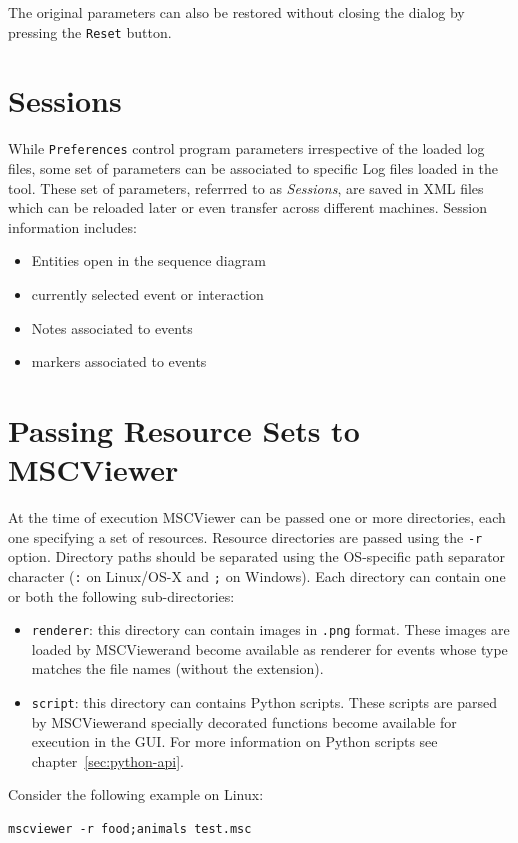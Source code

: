 \documentclass[11pt, twoside, titlepage]{book}
\newcommand{\prog}{MSCViewer}
\begin{document}
The original parameters can also be restored without closing the dialog by pressing the \texttt{Reset}
button.
 
\section{Sessions}
While \texttt{Preferences} control program parameters irrespective of the loaded log files, some set 
of parameters can be associated to specific Log files loaded in the tool. These set of parameters, 
referrred to as \textit{Sessions}, are saved in XML files which can be reloaded later or even
transfer across different machines. Session information includes:
\begin{itemize}
\item Entities open in the sequence diagram
\item currently selected event or interaction
\item Notes associated to events
\item markers associated to events
\end{itemize}

\section{Passing Resource Sets to \prog{}}
At the time of execution \prog{} can be passed one or more directories, each one specifying a set of resources.
Resource directories are passed using the \texttt{-r} option. Directory paths should be separated using 
the OS-specific path separator character (\texttt{:} on Linux/OS-X and \texttt{;} on Windows). 
Each directory can contain one or both the following sub-directories:
\begin{itemize}
\item \texttt{renderer}: this directory can contain images in \texttt{.png} format. These images
are loaded by \prog and become available as renderer for events whose type matches the file names (without the extension).
\item \texttt{script}: this directory can contains Python scripts. These scripts are parsed by \prog and 
specially decorated functions become available for execution in the GUI. For more information 
on Python scripts see chapter~\ref{sec:python-api}. 
\end{itemize}

Consider the following example on Linux:
\begin{lstlisting}
mscviewer -r food;animals test.msc
\end{lstlisting}
\end{document}
